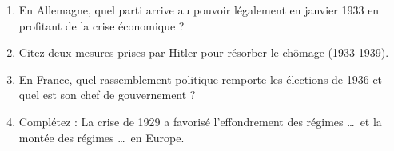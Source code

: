 \documentclass[11pt]{article}
\begin{document}
\begin{exercice}
\begin{enumerate}
    \item En Allemagne, quel parti arrive au pouvoir légalement en janvier 1933 en profitant de la crise économique ?
    \item Citez deux mesures prises par Hitler pour résorber le chômage (1933-1939).
    \item En France, quel rassemblement politique remporte les élections de 1936 et quel est son chef de gouvernement ?
    \item Complétez : La crise de 1929 a favorisé l'effondrement des régimes \ldots\ et la montée des régimes \ldots\ en Europe.
\end{enumerate}
\end{exercice}
\end{document}
